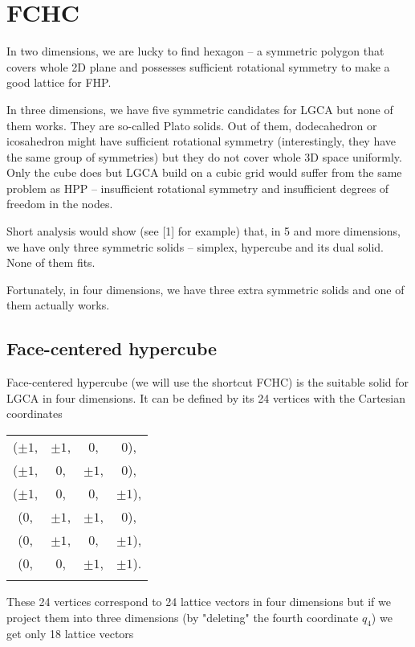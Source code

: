 \chapter{FCHC}

In two dimensions, we are lucky to find hexagon -- a symmetric polygon that covers whole 2D plane and possesses sufficient rotational symmetry to make a good lattice for FHP.

In three dimensions, we have five symmetric candidates for LGCA but none of them works.
They are so-called Plato solids. Out of them, dodecahedron or icosahedron might have sufficient rotational symmetry (interestingly, they have the same group of symmetries)
but they do not cover whole 3D space uniformly. Only the cube does but LGCA build on a cubic grid would suffer from the same problem as HPP -- insufficient rotational symmetry and insufficient degrees of freedom in the nodes.

Short analysis would show (see [1] for example) that, in 5 and more dimensions, we have only three symmetric solids -- simplex, hypercube and its dual solid. None of them fits.

\bigskip

Fortunately, in four dimensions, we have three extra symmetric solids and one of them actually works.

\section{Face-centered hypercube}
Face-centered hypercube (we will use the shortcut FCHC) is the suitable solid for LGCA in four dimensions. It can be defined by its 24 vertices with the Cartesian coordinates

\begin{tabular}{cccc}
\\
($\pm 1$,& $\pm 1$,& $0$,& $0$),\\
($\pm 1$,& $0$,& $\pm 1$,& $0$),\\
($\pm 1$,& $0$,& $0$,& $\pm 1$),\\
($0$,& $\pm 1$,& $\pm 1$,& $0$),\\
($0$,& $\pm 1$,& $0$,& $\pm 1$),\\
($0$,& $0$,& $\pm 1$,& $\pm 1$).\\
\\
\end{tabular}

These 24 vertices correspond to 24 lattice vectors in four dimensions but if we project them into three dimensions (by "deleting" the fourth coordinate $q_4$) we get only 18 lattice vectors

